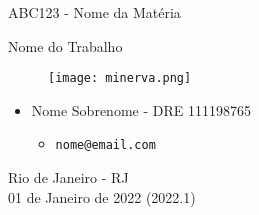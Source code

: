 \begin{titlepage}
    \begin{center}
        \vspace{1.0cm}

        \LARGE
        ABC123 - Nome da Matéria

        \vspace{1.5cm}

        \Huge
        Nome do Trabalho

        \vspace{1.5cm}

        \Huge
        \begin{figure}[h]
            \centering
            \texttt{[image: minerva.png]}
        \end{figure}

        \vspace{2.5cm}

        \large
        \begin{itemize}
            \item Nome Sobrenome - DRE 111198765
            \begin{itemize}
                \item \texttt{nome@email.com}
            \end{itemize}
        \end{itemize}

        \vspace{1.5cm}


        \vspace{0.5cm}
        \vfill
        \vspace{1.0cm}
        
        \large
        Rio de Janeiro - RJ\\
        01 de Janeiro de 2022 (2022.1)

    \end{center}
\end{titlepage}